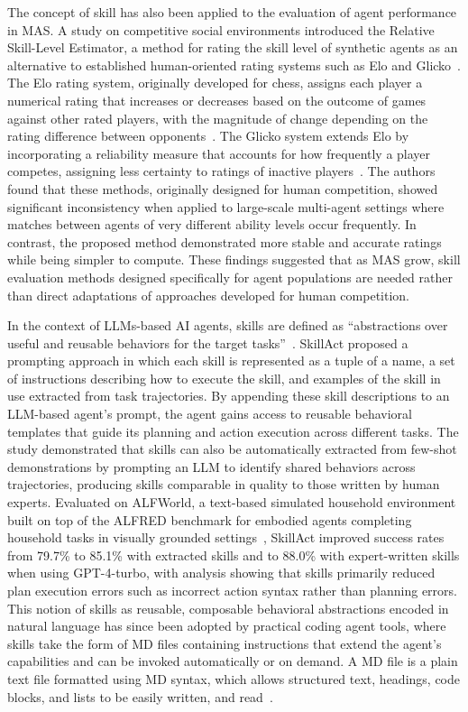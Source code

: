 \documentclass[
english,                 %
bibtex,                  %
includeExtraAbstracts, %
]{kththesis}
\numberwithin{listing}{chapter}
\begin{document}
The concept of skill has also been applied to the evaluation of agent performance in \gls{MAS}. A study on competitive social environments introduced the Relative Skill-Level Estimator, a method for rating the skill level of synthetic agents as an alternative to established human-oriented rating systems such as Elo and Glicko~\cite{kiourt_rating_2019}. The Elo rating system, originally developed for chess, assigns each player a numerical rating that increases or decreases based on the outcome of games against other rated players, with the magnitude of change depending on the rating difference between opponents~\cite{elo_rating_1978}. The Glicko system extends Elo by incorporating a reliability measure that accounts for how frequently a player competes, assigning less certainty to ratings of inactive players~\cite{glickman_glicko_2016}. The authors found that these methods, originally designed for human competition, showed significant inconsistency when applied to large-scale multi-agent settings where matches between agents of very different ability levels occur frequently. In contrast, the proposed method demonstrated more stable and accurate ratings while being simpler to compute. These findings suggested that as \gls{MAS} grow, skill evaluation methods designed specifically for agent populations are needed rather than direct adaptations of approaches developed for human competition.

In the context of \glspl{LLM}-based \gls{AI} agents, skills are defined as ``abstractions over useful and reusable behaviors for the target tasks''~\cite{liu_skillact_2024}. SkillAct proposed a prompting approach in which each skill is represented as a tuple of a name, a set of instructions describing how to execute the skill, and examples of the skill in use extracted from task trajectories. By appending these skill descriptions to an \gls{LLM}-based agent's prompt, the agent gains access to reusable behavioral templates that guide its planning and action execution across different tasks. The study demonstrated that skills can also be automatically extracted from few-shot demonstrations by prompting an \gls{LLM} to identify shared behaviors across trajectories, producing skills comparable in quality to those written by human experts. Evaluated on \gls{ALF}World, a text-based simulated household environment built on top of the \gls{ALFRED} benchmark for embodied agents completing household tasks in visually grounded settings~\cite{shridhar_alfworld_2021}, SkillAct improved success rates from 79.7\% to 85.1\% with extracted skills and to 88.0\% with expert-written skills when using \gls{GPT}-4-turbo, with analysis showing that skills primarily reduced plan execution errors such as incorrect action syntax rather than planning errors. This notion of skills as reusable, composable behavioral abstractions encoded in natural language has since been adopted by practical coding agent tools, where skills take the form of \gls{MD} files containing instructions that extend the agent's capabilities and can be invoked automatically or on demand. A \gls{MD} file is a plain text file formatted using \gls{MD} syntax, which allows structured text, headings, code blocks, and lists to be easily written, and read~\cite{gruber_daring_2004}.
\end{document}
